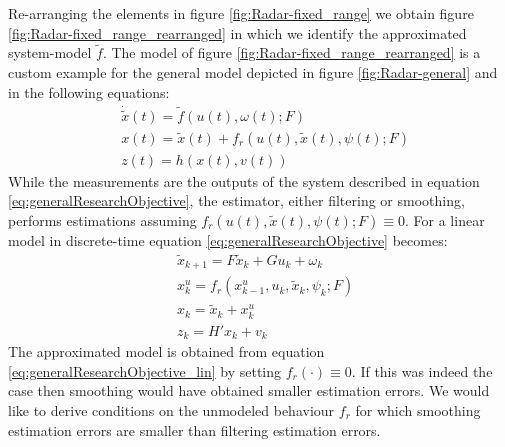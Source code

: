 \documentclass[oneside,12pt]{article}
\begin{document}
%
Re-arranging the elements in figure \ref{fig:Radar-fixed_range} we obtain figure \ref{fig:Radar-fixed_range_rearranged} in which we identify the approximated system-model $\tilde{f}$. The model of figure \ref{fig:Radar-fixed_range_rearranged} is a custom example for the general model depicted in figure \ref{fig:Radar-general} and in the following equations:
%
\begin{equation}\label{eq:generalResearchObjective}
    \begin{split}
        &\dot{\tilde{x}}(t) = \tilde{f}\left( u(t), \omega(t); F \right)\\
        &x(t) = \tilde{x}(t) + f_r\left( u(t), \tilde{x}(t), \psi(t); F\right)\\
        &z(t) = h\left( x(t), v(t)\right)
    \end{split}
\end{equation}
%
While the measurements are the outputs of the system described in equation \ref{eq:generalResearchObjective}, the estimator, either filtering or smoothing, performs estimations assuming $f_r\left( u(t), \tilde{x}(t), \psi(t); F\right) \equiv 0$. For a linear model in discrete-time equation \ref{eq:generalResearchObjective} becomes: 
%
\begin{equation}\label{eq:generalResearchObjective_lin}
    \begin{split}
        &\tilde{x}_{k+1} = F\tilde{x}_{k} + Gu_k +  \omega_k\\
        &x^u_{k} = f_r\left( x^u_{k-1}, u_k, \tilde{x}_k, \psi_k; F\right)\\
        &x_k = \tilde{x}_k + x^u_{k}\\
        &z_k = H'x_k + v_k
    \end{split}
\end{equation}
%
The approximated model is obtained from equation \ref{eq:generalResearchObjective_lin} by setting $f_r ( \cdot ) \equiv 0$. If this was indeed the case then smoothing would have obtained smaller estimation errors. We would like to derive conditions on the unmodeled behaviour $f_r$ for which smoothing estimation errors are smaller than filtering estimation errors.\\\\
\end{document}
